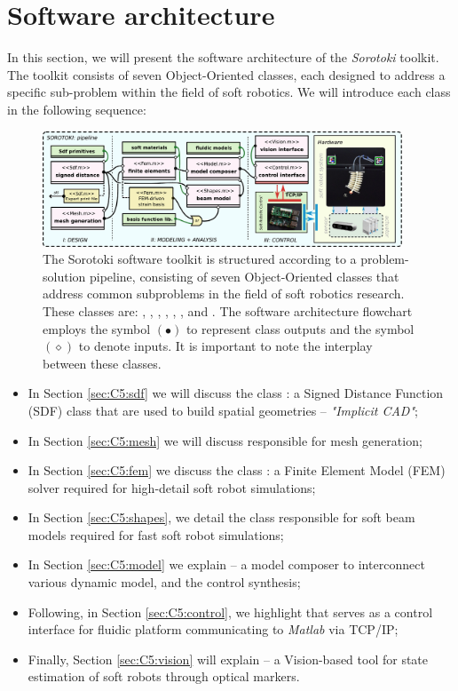 \section{Software architecture}
\label{sec:C5:software}
In this section, we will present the software architecture of the \textit{Sorotoki} toolkit. The toolkit consists of seven Object-Oriented classes, each designed to address a specific sub-problem within the field of soft robotics. We will introduce each class in the following sequence:

\begin{figure}
\includegraphics[width=0.955\textwidth]{./pdf/thesis-figure-6-2.pdf}    
\centering
\caption{\small The Sorotoki software toolkit is structured according to a problem-solution pipeline, consisting of seven Object-Oriented classes that address common subproblems in the field of soft robotics research. These classes are: , , , , , , and . The software architecture flowchart employs the symbol $(\bullet)$ to represent class outputs and the symbol $(\diamond)$ to denote inputs. It is important to note the interplay between these classes. \label{fig:C5:softwareArchitecture}}
\end{figure}
%
\begin{itemize}
    \setlength\itemsep{0.0em}
    \item In Section \ref{sec:C5:sdf} we will discuss the class : a Signed Distance Function (SDF) class that are used to build spatial geometries --  \emph{"Implicit CAD"};
    \item In Section \ref{sec:C5:mesh} we will discuss  responsible for mesh generation;
    \item In Section \ref{sec:C5:fem} we discuss the class : a Finite Element Model (FEM) solver required for high-detail soft robot simulations;
    \item In Section \ref{sec:C5:shapes}, we detail the class  responsible for soft beam models required for fast soft robot simulations;
    \item In Section \ref{sec:C5:model} we explain  -- a model composer to interconnect various dynamic model, and the control synthesis;
    \item Following, in Section \ref{sec:C5:control}, we highlight  that serves as a control interface for fluidic platform communicating to \textit{Matlab} via TCP/IP;
    \item Finally, Section \ref{sec:C5:vision} will explain  -- a Vision-based tool for state estimation of soft robots through optical markers.
\end{itemize}
